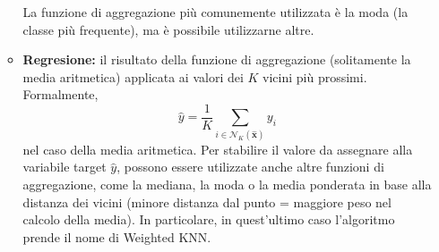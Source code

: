 \begin{enumerate}
\begin{itemize}
    La funzione di aggregazione più comunemente utilizzata è la moda (la classe più frequente), ma è possibile utilizzarne altre.
    
    \item \textbf{Regresione:} il risultato della funzione di aggregazione (solitamente la media aritmetica) applicata ai valori 
    dei \( K \) vicini più prossimi. Formalmente,
    \[
    \hat{y} = \frac{1}{K} \sum_{i \in \mathcal{N}_K(\hat{\mathbf{x}})} y_i
    \]
    nel caso della media aritmetica.
    Per stabilire il valore da assegnare alla variabile target $\hat{y}$, possono essere utilizzate
    anche altre funzioni di aggregazione, come la mediana, la moda o la media ponderata in base alla distanza dei vicini (minore distanza 
    dal punto = maggiore peso nel calcolo della media). 
    In particolare, in quest'ultimo caso l'algoritmo prende il nome di Weighted KNN. 

%
%
%

    \end{itemize}
\end{enumerate}

